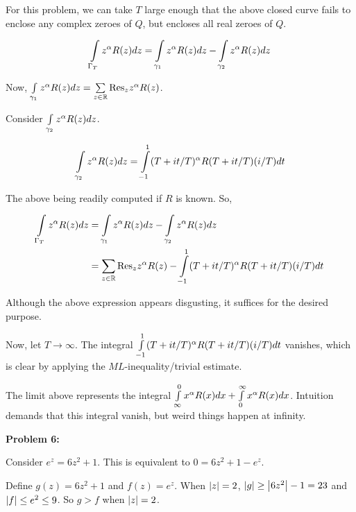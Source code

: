 \documentclass[a4paper,12pt]{article}
\begin{document}
\shunt %

For this problem, we can take $T$ large enough that the above closed curve fails to enclose any complex zeroes of $Q$, but encloses all real zeroes of $Q$.

\begin{align*}
\int\limits_{\Gamma_T} z^\alpha R(z) dz &= \int\limits_{\gamma_1} z^\alpha R(z) dz - \int\limits_{\gamma_2} z^\alpha R(z) dz\\
\end{align*} %

Now, $\int\limits_{\gamma_1} z^\alpha R(z) dz =\sum\limits_{z \in \mathbb{R}} \text{Res}_z z^\alpha R(z)$.

Consider $\int\limits_{\gamma_2} z^\alpha R(z) dz$.

\begin{align*}
\int\limits_{\gamma_2} z^\alpha R(z) dz &= \int\limits_{-1}^1 (T+it/T)^\alpha R(T+it/T) (i/T) dt\\
\end{align*}

The above being readily computed if $R$ is known. So,

\begin{align*}
\int\limits_{\Gamma_T} z^\alpha R(z) dz &= \int\limits_{\gamma_1} z^\alpha R(z) dz - \int\limits_{\gamma_2} z^\alpha R(z) dz\\
&= \sum\limits_{z \in \mathbb{R}} \text{Res}_z z^\alpha R(z)-\int\limits_{-1}^1 (T+it/T)^\alpha R(T+it/T) (i/T) dt
\end{align*}

Although the above expression appears disgusting, it suffices for the desired purpose.

Now, let $T \to \infty$. The integral $\int\limits_{-1}^1 (T+it/T)^\alpha R(T+it/T) (i/T) dt$ vanishes, which is clear by applying the $ML$-inequality/trivial estimate.

The limit above represents the integral $\int\limits_{\infty}^0 x^\alpha R(x) dx + \int\limits_{0}^\infty x^\alpha R(x) dx$. Intuition demands that this integral vanish, but weird things happen at infinity.

\shunt

{\bf Problem 6:}

Consider $e^z = 6z^2 + 1$. This is equivalent to $0=6z^2 + 1 -e^z$.

Define $g(z) = 6z^2 +1$ and $f(z) = e^z$. When $\left\lvert z \right\rvert = 2$, $\left\lvert g \right\rvert \geq \left\lvert 6z^2 \right\rvert -1 = 23$ and $\left\lvert f \right\rvert \leq e^2 \leq 9$. So $g>f$ when $\left\lvert z \right\rvert = 2$.
\end{document}
